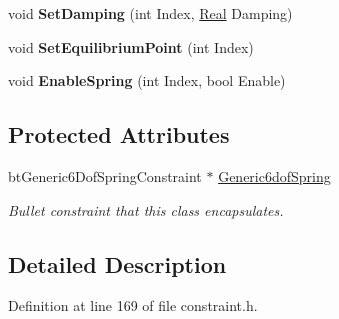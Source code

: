 \begin{DoxyCompactItemize}
\item 
\hypertarget{classphys_1_1Generic6DofSpringConstraint_a045ada78452b640730d93b1a55a07ed0}{
void {\bfseries SetDamping} (int Index, \hyperlink{namespacephys_af7eb897198d265b8e868f45240230d5f}{Real} Damping)}
\label{d1/dc7/classphys_1_1Generic6DofSpringConstraint_a045ada78452b640730d93b1a55a07ed0}

\item 
\hypertarget{classphys_1_1Generic6DofSpringConstraint_a2a7fac22f3e47671c66bfd0fea085544}{
void {\bfseries SetEquilibriumPoint} (int Index)}
\label{d1/dc7/classphys_1_1Generic6DofSpringConstraint_a2a7fac22f3e47671c66bfd0fea085544}

\item 
\hypertarget{classphys_1_1Generic6DofSpringConstraint_ad25cb82744be6045c53d41fe6fb33051}{
void {\bfseries EnableSpring} (int Index, bool Enable)}
\label{d1/dc7/classphys_1_1Generic6DofSpringConstraint_ad25cb82744be6045c53d41fe6fb33051}

\end{DoxyCompactItemize}
\subsection*{Protected Attributes}
\begin{DoxyCompactItemize}
\item 
\hypertarget{classphys_1_1Generic6DofSpringConstraint_aaa3b34568d2402155270c102e4719c07}{
btGeneric6DofSpringConstraint $\ast$ \hyperlink{classphys_1_1Generic6DofSpringConstraint_aaa3b34568d2402155270c102e4719c07}{Generic6dofSpring}}
\label{d1/dc7/classphys_1_1Generic6DofSpringConstraint_aaa3b34568d2402155270c102e4719c07}

\begin{DoxyCompactList}\small\item\em Bullet constraint that this class encapsulates. \item\end{DoxyCompactList}\end{DoxyCompactItemize}


\subsection{Detailed Description}


Definition at line 169 of file constraint.h.



